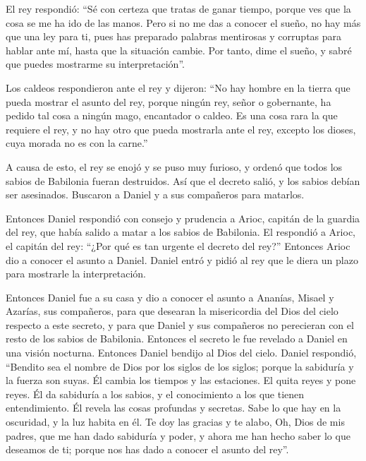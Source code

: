 El rey respondió: ``Sé con certeza que tratas de ganar
tiempo, porque ves que la cosa se me ha ido de las manos. 
Pero si no me das a conocer el sueño, no hay más que una ley para ti,
pues has preparado palabras mentirosas y corruptas para hablar ante mí,
hasta que la situación cambie. Por tanto, dime el sueño, y sabré que
puedes mostrarme su interpretación''.

 Los caldeos respondieron ante el rey y dijeron: ``No hay
hombre en la tierra que pueda mostrar el asunto del rey, porque ningún
rey, señor o gobernante, ha pedido tal cosa a ningún mago, encantador o
caldeo.  Es una cosa rara la que requiere el rey, y no
hay otro que pueda mostrarla ante el rey, excepto los dioses, cuya
morada no es con la carne.''

 A causa de esto, el rey se enojó y se puso muy furioso,
y ordenó que todos los sabios de Babilonia fueran destruidos.
 Así que el decreto salió, y los sabios debían ser
asesinados. Buscaron a Daniel y a sus compañeros para matarlos.

 Entonces Daniel respondió con consejo y prudencia a
Arioc, capitán de la guardia del rey, que había salido a matar a los
sabios de Babilonia.  El respondió a Arioc, el capitán
del rey: ``¿Por qué es tan urgente el decreto del rey?'' Entonces Arioc
dio a conocer el asunto a Daniel.  Daniel entró y pidió
al rey que le diera un plazo para mostrarle la interpretación.

 Entonces Daniel fue a su casa y dio a conocer el asunto
a Ananías, Misael y Azarías, sus compañeros,  para que
desearan la misericordia del Dios del cielo respecto a este secreto, y
para que Daniel y sus compañeros no perecieran con el resto de los
sabios de Babilonia.  Entonces el secreto le fue revelado
a Daniel en una visión nocturna. Entonces Daniel bendijo al Dios del
cielo.  Daniel respondió, ``Bendito sea el nombre de Dios
por los siglos de los siglos; porque la sabiduría y la fuerza son suyas.
 Él cambia los tiempos y las estaciones. El quita reyes y
pone reyes. Él da sabiduría a los sabios, y el conocimiento a los que
tienen entendimiento.  Él revela las cosas profundas y
secretas. Sabe lo que hay en la oscuridad, y la luz habita en él.
 Te doy las gracias y te alabo, Oh, Dios de mis padres,
que me han dado sabiduría y poder, y ahora me han hecho saber lo que
deseamos de ti; porque nos has dado a conocer el asunto del rey''.

